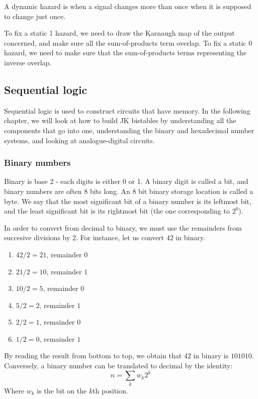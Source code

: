\documentclass{article}
\begin{document}
\begin{definition}
    A dynamic hazard is when a signal changes more than once when it is supposed to change just once.
\end{definition}

To fix a static 1 hazard, we need to draw the Karnaugh map of the output concerned, and make sure all the sum-of-products term overlap. To fix a static 0 hazard, we need to make sure that the sum-of-products terms representing the inverse overlap.

\newpage

\subsection{Sequential logic}

Sequential logic is used to construct circuits that have memory. In the following chapter, we will look at how to build JK bistables by understanding all the components that go into one, understanding the binary and hexadecimal number systems, and looking at analogue-digital circuits.

\subsubsection{Binary numbers}

Binary is base 2 - each digits is either 0 or 1. A binary digit is called a bit, and binary numbers are often 8 bits long. An 8 bit binary storage location is called a byte. We say that the most significant bit of a binary number is its leftmost bit, and the least significant bit is its rightmost bit (the one corresponding to $2^0$).

\begin{proposition}
    In order to convert from decimal to binary, we must use the remainders from succesive divisions by 2. For instance, let us convert $42$ in binary.
    \begin{enumerate}
        \item $42 / 2 = 21$, remainder $0$
        \item $21 / 2 = 10$, remainder $1$
        \item $10 / 2 = 5$, remainder $0$
        \item $5 / 2 = 2$, remainder $1$
        \item $2 / 2 = 1$, remainder $0$
        \item $1 / 2 = 0$, remainder $1$
    \end{enumerate}
    By reading the result from bottom to top, we obtain that $42$ in binary is $101010$. Conversely, a binary number can be translated to decimal by the identity:
    \[ n = \sum_k w_k 2^k \]
    Where $w_k$ is the bit on the $k$th position. 
\end{proposition}
\end{document}
